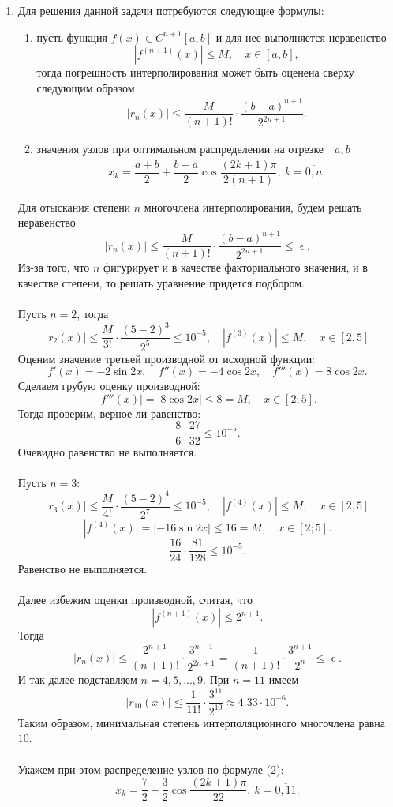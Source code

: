 \documentclass[a4paper, 12pt]{article}
\renewcommand{\leq}{\leqslant}
\renewcommand{\epsilon}{\upvarepsilon}
\begin{document}
\begin{enumerate}
	\newpage
	\item 
	\hypertarget{t6}{}
	Для решения данной задачи потребуются следующие формулы:
	\begin{enumerate}
		\item пусть функция $f(x)\in C^{n+1}[a,b]$ и для нее выполняется неравенство $$|f^{(n+1)}(x)|\leq M, \quad x\in [a,b],$$
		тогда погрешность интерполирования может быть оценена сверху следующим образом
		\begin{eqnarray}
			|r_n(x)| \leq \dfrac{M}{(n+1)!}\cdot \dfrac{(b-a)^{n+1}}{2^{2n+1}}.
		\end{eqnarray}
		\item значения узлов при оптимальном распределении на отрезке $[a,b]$
		\begin{eqnarray}
			x_k = \dfrac{a+b}{2} + \dfrac{b-a}{2}\cos \dfrac{(2k+1)\pi}{2(n+1)},\ k=\overline{0,n}.
		\end{eqnarray}
	\end{enumerate}
	Для отыскания степени $n$ многочлена интерполирования, будем решать неравенство $$|r_n(x)| \leq \dfrac{M}{(n+1)!}\cdot \dfrac{(b-a)^{n+1}}{2^{2n+1}}\leq \epsilon.$$
	Из-за того, что $n$ фигурирует и в качестве факториального значения, и в качестве степени, то решать уравнение придется подбором.\\\\
	Пусть $n=2$, тогда 
	$$|r_2(x)| \leq \dfrac{M}{3!}\cdot \dfrac{(5-2)^{3}}{2^{5}}\leq 10^{-5},\quad |f^{(3)}(x)|\leq M,\quad x\in [2,5]$$
	Оценим значение третьей производной от исходной функции:
	$$f'(x) = -2\sin 2x,\quad f''(x) =-4\cos2x ,\quad f'''(x) = 8\cos2x.$$
	Сделаем грубую оценку производной: $$|f'''(x)| = |8\cos2x| \leq 8 = M,\quad x\in [2;5].$$
	Тогда проверим, верное ли равенство:
	$$\dfrac{8}{6}\cdot \dfrac{27}{32}\leq 10^{-5}.$$
	Очевидно равенство не выполняется.\\\\
	Пусть $n=3$:
	$$|r_3(x)| \leq \dfrac{M}{4!}\cdot \dfrac{(5-2)^{4}}{2^{7}}\leq 10^{-5},\quad |f^{(4)}(x)|\leq M,\quad x\in [2,5]$$
	$$|f^{(4)}(x)| = |-16\sin2x| \leq 16 = M,\quad x\in [2;5].$$
	$$\dfrac{16}{24}\cdot \dfrac{81}{128}\leq 10^{-5}.$$
	Равенство не выполняется.
	\\\\
	Далее избежим оценки производной, считая, что $$|f^{(n+1)}(x)|\leq 2^{n+1}.$$
	Тогда $$|r_n(x)| \leq \dfrac{2^{n+1}}{(n+1)!}\cdot \dfrac{3^{n+1}}{2^{2n+1}} = \dfrac{1}{(n+1)!}\cdot \dfrac{3^{n+1}}{2^{n}}\leq \epsilon.$$
	И так далее подставляем $n=4,5,...,9$. При $n=11$ имеем $$|r_{10}(x)| \leq \dfrac{1}{11!}\cdot \dfrac{3^{11}}{2^{10}}\approx 4.33\cdot 10^{-6}.$$
	Таким образом, минимальная степень интерполяционного многочлена равна $10$.\\\\
	Укажем при этом распределение узлов по формуле (2):
	$$	x_k = \dfrac{7}{2} + \dfrac{3}{2}\cos \dfrac{(2k+1)\pi}{22},\ k=\overline{0,11}.$$
	

\end{enumerate}
\end{document}
